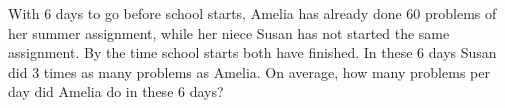 With $6$ days to go before school starts, Amelia has already done $60$ problems of her summer assignment, while her niece Susan has not started the same assignment. By the time school starts both have finished. In these $6$ days Susan did $3$ times as many problems as Amelia. On average, how many problems per day did Amelia do in these $6$ days?

